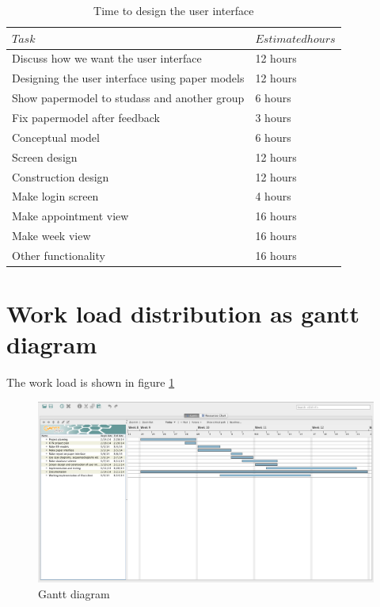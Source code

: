 \documentclass[a4paper, english, 12pt]{article}
\begin{document}
\begin{table}[h!]
    \begin{center}
    \caption{Time to design the user interface} 
    \label{UI}
    \vspace{0,5cm}
    \begin{tabular}{ll} \\ 
        \hline
        $Task$ & $Estimated hours$\\
        \hline 
    Discuss how we want the user interface & 12 hours\\
    Designing the user interface using paper models & 12 hours\\    
    Show papermodel to studass and another group & 6 hours\\
    Fix papermodel after feedback & 3 hours\\
    Conceptual model & 6 hours\\
    Screen design & 12 hours\\
    Construction design & 12 hours\\
    Make login screen & 4 hours\\
    Make appointment view & 16 hours\\
    Make week view & 16 hours\\
    Other functionality & 16 hours\\
        \hline
    \end{tabular}
    \end{center}
\end{table}
\section{Work load distribution as gantt diagram}
The work load is shown in figure \ref{gantt}

\begin{figure}[h!] %
    \begin{center} %
    	\includegraphics[width=15cm]{GanttDiagram.png}
		\caption{Gantt diagram}
	\label{gantt}
	\end{center}
\end{figure}
\end{document}
